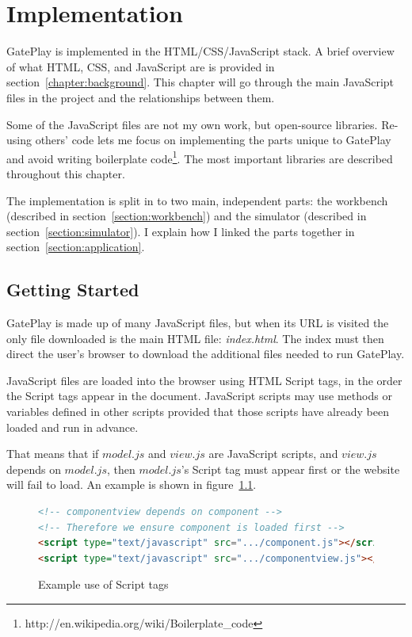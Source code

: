 \chapter{Implementation}
\label{chapter:implementation}

GatePlay is implemented in the HTML/CSS/JavaScript stack. A brief overview of what HTML, CSS, and JavaScript are is provided in section~\ref{chapter:background}. This chapter will go through the main JavaScript files in the project and the relationships between them.

Some of the JavaScript files are not my own work, but open-source libraries. Re-using others' code lets me focus on implementing the parts unique to GatePlay and avoid writing boilerplate code\footnote{http://en.wikipedia.org/wiki/Boilerplate\_code}. The most important libraries are described throughout this chapter.

The implementation is split in to two main, independent parts: the workbench (described in section~\ref{section:workbench}) and the simulator (described in section~\ref{section:simulator}). I explain how  I linked the parts together in section~\ref{section:application}.

\section{Getting Started}
GatePlay is made up of many JavaScript files, but when its URL is visited the only file downloaded is the main HTML file: \textit{index.html}. The index must then direct the user's browser to download the additional files needed to run GatePlay.

JavaScript files are loaded into the browser using HTML Script tags, in the order the Script tags appear in the document. JavaScript scripts may use methods or variables defined in other scripts provided that those scripts have already been loaded and run in advance.

That means that if $model.js$ and $view.js$ are JavaScript scripts, and $view.js$ depends on $model.js$, then $model.js$'s Script tag must appear first or the website will fail to load. An example is shown in figure~\ref{fig:scripttags}.

\begin{figure}[H]
\begin{lstlisting}[language=html]
<!-- componentview depends on component -->
<!-- Therefore we ensure component is loaded first -->
<script type="text/javascript" src=".../component.js"></script>
<script type="text/javascript" src=".../componentview.js"></script>
\end{lstlisting}
\caption{Example use of Script tags}
\label{fig:scripttags}
\end{figure}

